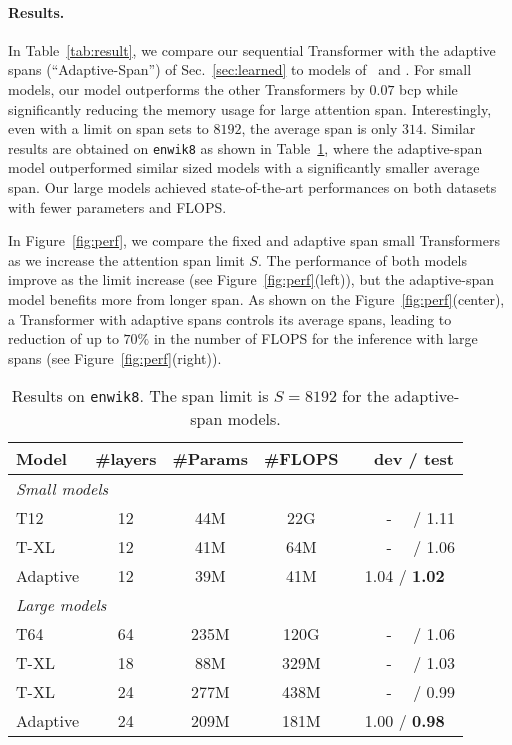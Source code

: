 \documentclass[11pt,a4paper]{article}
\newcommand{\fig}[1]{Figure~\ref{fig:#1}}
\newcommand{\tab}[1]{Table~\ref{tab:#1}}
\begin{document}
\paragraph{Results.}
In \tab{result}, we compare our sequential Transformer with the adaptive spans (``Adaptive-Span'') of Sec.~\ref{sec:learned} to models of~\citet{al2018character} and \citet{dai2018transformer}.
For small models, our model outperforms the other Transformers  by $0.07$ bcp while significantly reducing the memory usage for large attention span.
Interestingly, even with a limit on span sets to $8192$, the average span is only $314$.
Similar results are obtained on \texttt{enwik8} as shown in \tab{enwiki}, where the adaptive-span model outperformed similar sized models with a significantly smaller average span. Our large models achieved state-of-the-art performances on both datasets with fewer parameters and FLOPS.

In \fig{perf}, we compare the fixed and adaptive span small Transformers as we increase the attention span limit $S$.
The performance of both models improve as the limit increase (see \fig{perf}(left)), but the adaptive-span model benefits more from longer span.
As shown on the \fig{perf}(center), a Transformer with adaptive spans controls its average spans, leading to reduction of up to $70\%$ in the number of FLOPS for the inference with large spans (see \fig{perf}(right)).

\begin{table}[t]
\centering
\setlength{\tabcolsep}{2.5pt}
\begin{tabular}{lcccc}
  \toprule
  Model & \#layers & \#Params & \#FLOPS & ~~dev / test \\
  \midrule
  \multicolumn{5}{l}{\emph{Small models}}\\
  T12 & 12 & 44M & 22G & ~~~~-~~ / 1.11 \\
  T-XL & 12 & 41M & 64M & ~~~~-~~ / 1.06 \\
  Adaptive & 12 & 39M & 41M & 1.04 / \bf 1.02 \\
  \midrule
  \multicolumn{5}{l}{\emph{Large models}}\\
  T64 & 64 & 235M & 120G & ~~~~-~~ / 1.06 \\
  T-XL & 18 & 88M & 329M & ~~~~-~~ / 1.03 \\
  T-XL & 24 & 277M & 438M & ~~~~-~~ / 0.99 \\
  Adaptive & 24 & 209M & 181M & 1.00 / \bf 0.98 \\
  \bottomrule
\end{tabular}
  \caption{
    Results on \texttt{enwik8}. The span limit is $S=8192$ for the adaptive-span models.
  }
\label{tab:enwiki}
\end{table}
\end{document}
